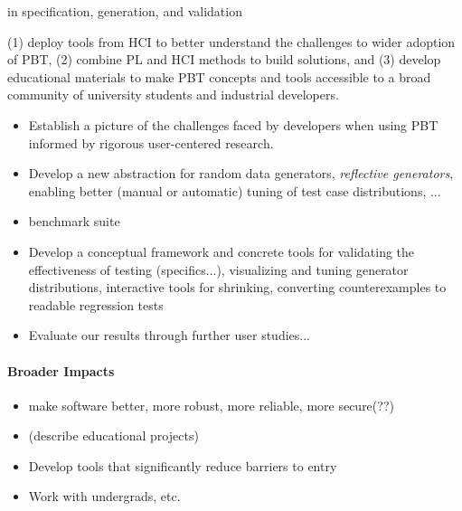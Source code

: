  in specification, generation, and validation


 (1) deploy tools from HCI to better
understand the challenges to wider adoption of PBT, (2) combine PL and
HCI methods to build solutions, and (3) develop educational materials
to make PBT concepts and tools accessible to a broad community of
university students and industrial developers.

\begin{itemize}
\item Establish a picture of the challenges
faced by developers when using PBT informed by rigorous user-centered research.
\item Develop a new abstraction for random data generators, {\em
  reflective generators}, enabling better (manual or automatic) tuning of test case
distributions, ...
\item benchmark suite
\item Develop a conceptual framework and concrete tools for validating
the effectiveness of testing (specifics...),
visualizing and tuning generator distributions,
interactive tools for shrinking,
converting counterexamples to readable regression tests
\item Evaluate our results through further user studies...
\end{itemize}

\paragraph*{Broader Impacts}
\begin{itemize}
\item make software better, more robust, more reliable, more secure(??)
\item (describe educational projects)
\item Develop tools that significantly reduce barriers to entry
\item Work with undergrads, etc.
\end{itemize}

